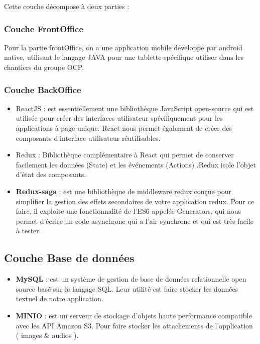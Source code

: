 Cette couche d\'ecompose \`a deux parties :

\subsubsection{Couche FrontOffice}

Pour la partie frontOffice, on a une application mobile d\'evelopp\'e par android native, utilisant le langage JAVA pour une tablette sp\'ecifique utiliser dans les chantiers du groupe \gls{OCP}. 

\subsubsection{Couche BackOffice}
\begin{itemize}

\item \textcolor{react}{ReactJS} : est essentiellement une biblioth\`eque JavaScript open-source qui est utilis\'ee pour cr\'eer des interfaces utilisateur sp\'ecifiquement pour les applications \`a page unique. React nous permet \'egalement de cr\'eer des composants d'interface utilisateur r\'eutilisables.

\item \textcolor{redux}{Redux} : Biblioth\`eque compl\'ementaire \`a React qui permet de conserver facilement les donn\'ees (State) et les \'ev\'enements (Actions) .Redux isole l'objet d'\'etat des composants.

\item \textbf{Redux-saga} : est une biblioth\`eque de middleware redux con\c{c}ue pour simplifier la gestion des effets secondaires de votre application redux. Pour ce faire, il exploite une fonctionnalit\'e de l'ES6 appel\'ee Generators, qui nous permet d'\'ecrire un code asynchrone qui a l'air synchrone et qui est tr\`es facile \`a tester.

\end{itemize}

\subsection{Couche Base de donn\'ees}
\begin{itemize}
\item \textbf{MySQL} : est un syst\`eme de gestion de base de donn\'ees relationnelle open source bas\'e sur le langage \gls{SQL}. Leur utilit\'e est faire stocker les donn\'ees textuel de notre application.
\item \textbf{MINIO} : est un serveur de stockage d'objets haute performance compatible avec les API Amazon S3. Pour faire stocker les attachements de l'application ( images \& audios ).
\end{itemize}

